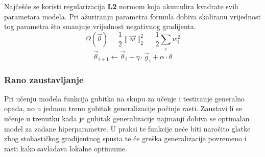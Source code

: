 \documentclass[times, utf8, numeric, diplomski]{fer}
\def\TODO#1{\noindent\textcolor{red}{TODO: \textit{#1}}\newline}
\def\todo#1{\TODO{#1}}
\begin{document}
Najčešće se koristi regularizacija \textbf{L2} normom koja akumulira kvadrate svih parametara modela. Pri ažuriranju parametra formula dobiva skaliranu vrijednost tog parametra što smanjuje vrijednost negativnog gradijenta.
\begin{equation}
\Omega(\vec{\theta}) = \frac{1}{2} \|\vec{w}\|_2^2 = \frac{1}{2} \sum_i w_i^2
\end{equation}
\begin{equation}
\vec{\theta}_{i+1} \gets \vec{\theta}_i - \eta \cdot \vec{g}_i + \alpha \cdot \theta
\end{equation}


%

\subsubsection{Rano zaustavljanje}
Pri učenju modela funkcija gubitka na skupu za učenje i testiranje generalno opada, no u jednom trenu gubitak generalizacije počinje rasti. Zaustavi li se učenje u trenutku kada je gubitak generalizacije najmanji dobiva se optimalan model za zadane hiperparametre. U praksi te funkcije neće biti naročito glatke zbog stohastičkog gradijentnog spusta te će greška generalizacije povremeno i rasti kako savladava lokalne optimume.
\end{document}
